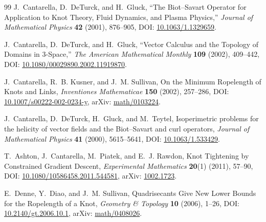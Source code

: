 \documentclass[11pt]{article}
\theoremstyle{definition}
\theoremstyle{plain}
\theoremstyle{remark}
\begin{document}
\begin{thebibliography}{99}
            J.~Cantarella, D.~DeTurck, and H.~Gluck,
            \newblock ``The Biot--Savart Operator for Application to Knot Theory, Fluid Dynamics, and Plasma Physics,''
            \newblock \emph{Journal of Mathematical Physics} \textbf{42} (2001), 876--905,
            \newblock DOI: \href{https://doi.org/10.1063/1.1329659}{10.1063/1.1329659}.

            J.~Cantarella, D.~DeTurck, and H.~Gluck,
            \newblock ``Vector Calculus and the Topology of Domains in 3-Space,''
            \newblock \emph{The American Mathematical Monthly} \textbf{109} (2002), 409--442,
            \newblock DOI: \href{https://doi.org/10.1080/00029890.2002.11919870}{10.1080/00029890.2002.11919870}.

            J.~Cantarella, R.~B. Kusner, and J.~M. Sullivan,
            \newblock On the Minimum Ropelength of Knots and Links,
            \newblock \emph{Inventiones Mathematicae} \textbf{150} (2002), 257--286,
            \newblock DOI: \href{https://doi.org/10.1007/s00222-002-0234-y}{10.1007/s00222-002-0234-y},
            \newblock arXiv: \href{https://arxiv.org/abs/math/0103224}{math/0103224}.

            J.~Cantarella, D.~DeTurck, H.~Gluck, and M.~Teytel,
            \newblock Isoperimetric problems for the helicity of vector fields and the Biot--Savart and curl operators,
            \newblock \emph{Journal of Mathematical Physics} \textbf{41} (2000), 5615--5641,
            \newblock DOI: \href{https://doi.org/10.1063/1.533429}{10.1063/1.533429}.

            T.~Ashton, J.~Cantarella, M.~Piatek, and E.~J. Rawdon,
            \newblock Knot Tightening by Constrained Gradient Descent,
            \newblock \emph{Experimental Mathematics} \textbf{20}(1) (2011), 57--90,
            \newblock DOI: \href{https://doi.org/10.1080/10586458.2011.544581}{10.1080/10586458.2011.544581},
            \newblock arXiv: \href{https://arxiv.org/abs/1002.1723}{1002.1723}.

            E.~Denne, Y.~Diao, and J.~M. Sullivan,
            \newblock Quadrisecants Give New Lower Bounds for the Ropelength of a Knot,
            \newblock \emph{Geometry \& Topology} \textbf{10} (2006), 1--26,
            \newblock DOI: \href{https://doi.org/10.2140/gt.2006.10.1}{10.2140/gt.2006.10.1},
            \newblock arXiv: \href{https://arxiv.org/abs/math/0408026}{math/0408026}.


\end{thebibliography}
\end{document}
